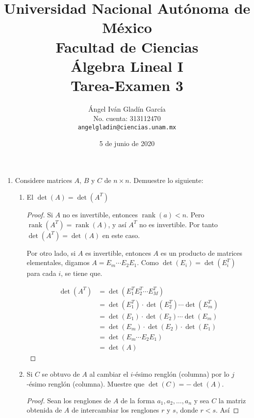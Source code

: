\documentclass[letterpaper]{article}
\DeclareMathOperator{\rank}{rank}
\begin{document}
\title{
        Universidad Nacional Autónoma de México\\
        Facultad de Ciencias\\
        Álgebra Lineal I\\
    \vspace{.5cm}
    \large
        \textbf{Tarea-Examen 3}
}
\author{
    Ángel Iván Gladín García\\
    No. cuenta: 313112470\\
    \texttt{angelgladin@ciencias.unam.mx}
}
\date{5 de junio de 2020}
\maketitle

\begin{enumerate}

\item Considere matrices $A$, $B$ y $C$ de $n \times n$. Demuestre lo siguiente:
\begin{enumerate}[label=(\alph*)]
    \item El $\det(A) = \det\left( A^T \right)$
    \begin{proof}
    Si $A$ no es invertible, entonces $\rank(a) < n$. Pero $\rank(A^T) = \rank(A)$, y así $A^T$ no es invertible.
    Por tanto $\det(A^T) = \det(A)$ en este caso.

    Por otro lado, si $A$ es invertible, entonces $A$ es un producto de matrices elementales, digamos
    $A = E_m \cdots E_2 E_1$. Como $\det(E_i) = \det(E_i^T)$ para cada $i$, se tiene que.

    \begin{align*}
        \det(A^T)
            &= \det(E_1^T E_2^T \cdots E_M^T)\\
            &= \det(E_1^T) \cdot \det(E_2^T) \cdots \det(E_m^T)\\
            &= \det(E_1) \cdot \det(E_2) \cdots \det(E_m)\\
            &= \det(E_m) \cdot \det(E_2) \cdot \det(E_1)\\
            &= \det(E_m \cdots E_2 E_1)\\
            &= \det(A)
    \end{align*}

    \end{proof}

    \item Si $C$ se obtuvo de $A$ al cambiar el $i$-ésimo renglón (columna) por lo $j$-ésimo renglón
    (columna). Muestre que $\det(C) = -\det(A)$.
    \begin{proof}
    Sean los renglones de $A$ de la forma $a_1, a_2, \ldots, a_n$ y sea $C$ la matriz obtenida de $A$ de intercambiar
    los renglones $r$ y $s$, donde $r < s$. Así
    

\end{proof}
\end{enumerate}
\end{enumerate}
\end{document}
